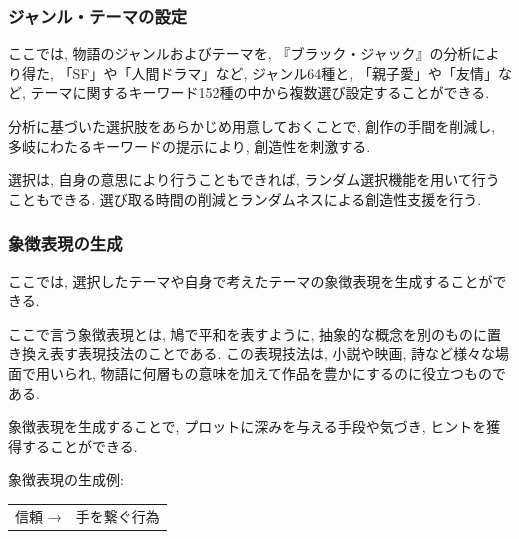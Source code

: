 \subsubsection{ジャンル・テーマの設定}
ここでは, 物語のジャンルおよびテーマを, 『ブラック・ジャック』の分析により得た, 「SF」や「人間ドラマ」など, ジャンル64種と, 「親子愛」や「友情」など, テーマに関するキーワード152種の中から複数選び設定することができる.

分析に基づいた選択肢をあらかじめ用意しておくことで, 創作の手間を削減し, 多岐にわたるキーワードの提示により, 創造性を刺激する. 

選択は, 自身の意思により行うこともできれば, ランダム選択機能を用いて行うこともできる. 選び取る時間の削減とランダムネスによる創造性支援を行う\cite{ref:Osone21}.

\subsubsection{象徴表現の生成}
ここでは, 選択したテーマや自身で考えたテーマの象徴表現を生成することができる. 

ここで言う象徴表現とは, 鳩で平和を表すように, 抽象的な概念を別のものに置き換え表す表現技法のことである. この表現技法は, 小説や映画, 詩など様々な場面で用いられ, 物語に何層もの意味を加えて作品を豊かにするのに役立つものである\cite{ref:Norva23}.

象徴表現を生成することで, プロットに深みを与える手段や気づき, ヒントを獲得することができる.

象徴表現の生成例:

\begin{table}[hbtp]
\small
\begin{center}
{
\label{adopt_t}
\begin{tabular}{cc} 
信頼  →& 手を繋ぐ行為
\end{tabular}
}
\end{center}
\end{table}

\vspace{-3zh}

